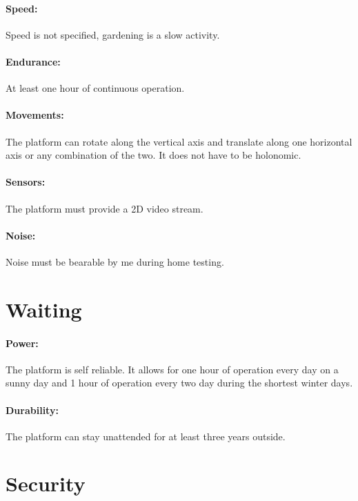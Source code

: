 \documentclass[oneside, DIV=11]{scrreprt}
\begin{document}
    \paragraph{Speed: } Speed is not specified, gardening is a slow activity.
    
    \paragraph{Endurance: } At least one hour of continuous operation.
    
    \paragraph{Movements: } The platform can rotate along the vertical axis and translate along one horizontal axis or any combination of the two. It does not have to be holonomic.
    
    \paragraph{Sensors: } The platform must provide a 2D video stream.
    
    \paragraph{Noise: } Noise must be bearable by me during home testing.
    
\section{Waiting}

    \paragraph{Power: } The platform is self reliable. It allows for one hour of operation every day on a sunny day and 1 hour of operation every two day during the shortest winter days.
    
    \paragraph{Durability: } The platform can stay unattended for at least three years outside. 
    
\section{Security}
\end{document}
